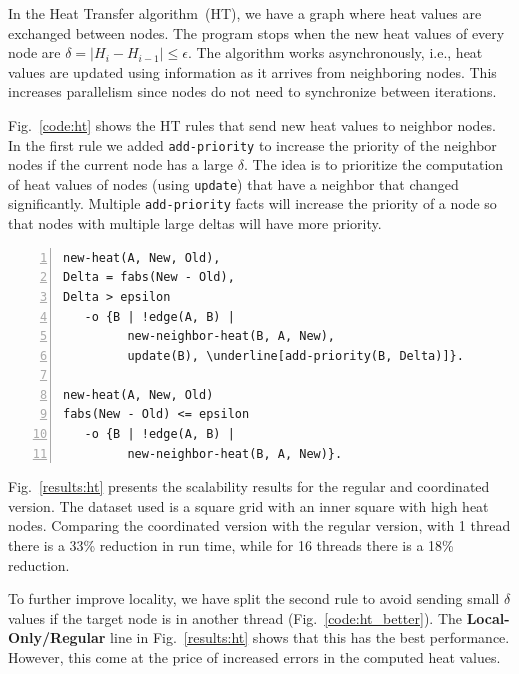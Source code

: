 In the Heat Transfer algorithm~(HT), we have a graph where heat values
are exchanged between nodes. The program stops when the new heat
values of every node are $\delta = |H_i - H_{i-1}| \le \epsilon$. The
algorithm works asynchronously, i.e., heat values are updated using
information as it arrives from neighboring nodes. This increases
parallelism since nodes do not need to synchronize between iterations.

Fig.~\ref{code:ht} shows the HT rules that send new heat values to
neighbor nodes. In the first rule we added \texttt{add-priority} to increase the priority of the neighbor
nodes if the current node has a large $\delta$. The idea is to prioritize the
computation of heat values of nodes (using \texttt{update}) that have a neighbor
that changed significantly. Multiple \texttt{add-priority} facts will
increase the priority of a node so that nodes with multiple large deltas will
have more priority.

\begin{topfig}
\scriptsize\begin{Verbatim}[numbers=left,commandchars=\\\[\]]
new-heat(A, New, Old),
Delta = fabs(New - Old),
Delta > epsilon
   -o {B | !edge(A, B) |
         new-neighbor-heat(B, A, New),
         update(B), \underline[add-priority(B, Delta)]}.

new-heat(A, New, Old)
fabs(New - Old) <= epsilon
   -o {B | !edge(A, B) |
         new-neighbor-heat(B, A, New)}.
\end{Verbatim}
\end{topfig}
\normalsize

Fig.~\ref{results:ht} presents the scalability results for the regular
and coordinated version. The dataset used is a square grid with an inner square
with high heat nodes. Comparing the coordinated version with the regular
version, with 1 thread there is a 33\% reduction in run time, while
for 16 threads there is a 18\% reduction.

To further improve locality, we have split the second rule to avoid sending
small $\delta$ values if the target node is in another thread
(Fig.~\ref{code:ht_better}). The \textbf{Local-Only/Regular} line
in Fig.~\ref{results:ht} shows that this has the best performance.  However, this
come at the price of increased errors in the computed heat values.

